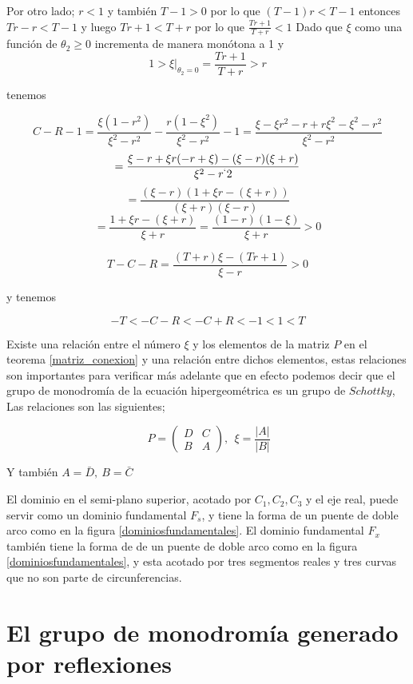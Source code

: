 Por otro lado; $r<1$ y tambi\'en $T-1>0$ por lo que $(T-1)r < T-1$ entonces $Tr-r < T-1$ y luego $Tr +1 < T+r$ por lo que $\frac{Tr +1}{T +r} < 1$
Dado que $\xi $ como una funci\'on de $\theta_{2} \geq 0$ incrementa de manera mon\'otona a 1 y $$1 > \xi |_{\theta_{2} =0} = \frac{Tr+1}{T+r} > r $$

tenemos

$$C-R-1 =\frac{\xi(1-r^{2})}{\xi^{2}-r^{2}} - \frac{r(1-\xi^{2})}{\xi^{2}-r^{2}}-1= \frac{\xi-\xi r^{2} -r + r\xi^{2}-\xi^{2} - r^{2}}{\xi^{2} - r^{2}}$$
$$= \frac{\xi-r + \xi r(-r + \xi)-(\xi -r)(\xi + r)}{ \xi^{2} - r^`{2}}$$
$$= \frac{(\xi -r)(1 + \xi r - (\xi +r))}{(\xi +r)(\xi -r)}$$
$$=\frac{1 + \xi r -(\xi +r)}{\xi +r}=\frac{(1-r)(1-\xi)}{\xi +r} > 0  $$

$$T-C-R =\frac{(T+r)\xi - (Tr +1)}{\xi -r} >0$$

y tenemos

$$-T < -C -R < -C + R < -1< 1< T $$

\begin{rem}
Existe una relaci\'on entre el n\'umero $\xi $ y los elementos de la matriz $P $ en el teorema \ref{matriz_conexion} y una relaci\'on entre dichos elementos, estas relaciones son importantes para verificar m\'as adelante que en efecto podemos decir que el grupo de monodrom\'ia de la ecuaci\'on hipergeom\'etrica es un grupo de $Schottky$, Las relaciones son las siguientes;

$$  \  P = \begin{pmatrix}
      D & C \\
      B & A
        \end{pmatrix} , \ \ \xi = \frac{|A|}{|B|}$$

 Y tambi\'en $A=\bar{D}, \ B= \bar{C}$
\end{rem}


El dominio en el semi-plano superior, acotado por $C_{1}, C_{2}, C_{3}$ y el eje real, puede servir como un dominio fundamental $F_{s}$, y tiene la forma de un puente de doble arco como en la figura \ref{dominiosfundamentales}. El dominio fundamental $F_{x}$ tambi\'en tiene la forma de de un  puente de doble arco como en la figura \ref{dominiosfundamentales}, y esta acotado por tres segmentos reales y tres curvas que no son parte de circunferencias.

\section{El grupo de monodrom\'ia generado por reflexiones}

